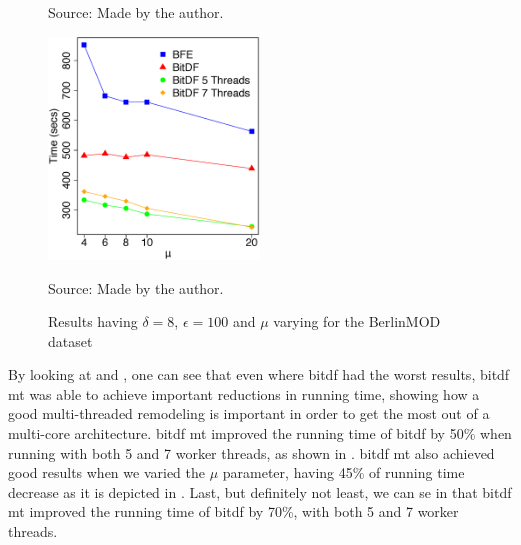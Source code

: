 {\begin{figure}[h!]
\begin{subfigure}[t]{0.49\textwidth}
        \label{fig:berlinmod_complete_vary_g}
    \end{subfigure}
    \footnotesize{Source: Made by the author.}
    \label{fig:berlinmod_complete_results}
\end{figure}

\begin{figure}[h!]
    \centering
    \caption{Results having $\delta = 8$, $\epsilon = 100$ and $\mu$ varying for the BerlinMOD dataset}
    \centerline{\includegraphics[width=0.5\textwidth]{images/BerlinMOD_complete_varying_n.eps}}
    \footnotesize{Source: Made by the author.}
    \label{fig:berlinmod_complete_vary_n}
\end{figure}

By looking at  and , one can see that even
where \ac{bitdf} had the worst results, \ac{bitdf} \ac{mt} was able to achieve important reductions in running time,
showing how a good multi-threaded remodeling is important in order to get the most out of a multi-core architecture.
\ac{bitdf} \ac{mt} improved the running time of \ac{bitdf} by 50\% when running with both 5 and 7 worker threads, as
shown in . \ac{bitdf} \ac{mt} also achieved good results when we varied the $\mu$
parameter, having 45\% of running time decrease as it is depicted in . Last, but
definitely not least, we can se in  that \ac{bitdf} \ac{mt} improved the running
time of \ac{bitdf} by 70\%, with both 5 and 7 worker threads.

}
